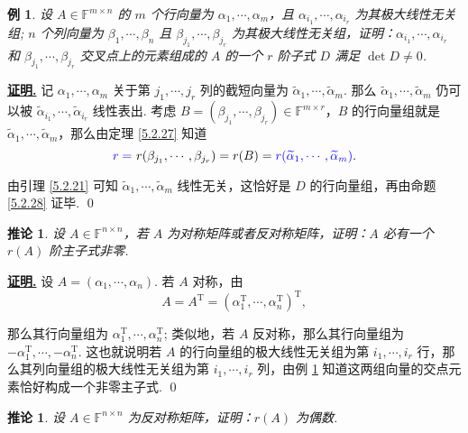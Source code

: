 \documentclass[10pt,openany]{article}
\theoremstyle{thmstyle} %
\theoremstyle{defstyle} %
\newtheorem{corollary}[theorem]{推论}
\theoremstyle{prostyle} %
\theoremstyle{exastyle}
\newtheorem{example}[theorem]{例}
\theoremstyle{remstyle}
\renewenvironment{proof}[1][证明]{\par\underline{\textbf{#1.}} \;\fangsong}{\qed\par}
\newcommand{\T}{^{\text{T}}}
\newcommand{\F}{\mathbb{F}}
\newcommand{\n}{^{n \times n}}
\newcommand{\mn}{^{m \times n}}
\begin{document}
\begin{example} \label{5.2.38}
	设 \( A \in \F\mn \) 的 \( m \) 个行向量为 \( \alpha_1,\cdots,\alpha_m \)，且 \( \alpha_{i_1},\cdots,\alpha_{i_r} \) 为其极大线性无关组; \( n \) 个列向量为 \( \beta_1,\cdots,\beta_n \) 且 \( \beta_{j_1},\cdots,\beta_{j_r} \) 为其极大线性无关组，证明：\( \alpha_{i_1},\cdots,\alpha_{i_r} \) 和 \( \beta_{j_1},\cdots,\beta_{j_r} \) 交叉点上的元素组成的 \( A \) 的一个 \( r \) 阶子式 \( D \) 满足 \( \det D \neq 0 \).
\end{example}

\begin{proof}
	记 \( \alpha_1,\cdots,\alpha_m \) 关于第 \( j_1,\cdots,j_r \) 列的截短向量为 \( \widetilde{\alpha}_1, \cdots, \widetilde{\alpha}_m \). 那么 {\color{blue} \( \widetilde{\alpha}_1, \cdots, \widetilde{\alpha}_m \) 仍可以被 \( \widetilde{\alpha}_{i_1}, \cdots, \widetilde{\alpha}_{i_r} \) 线性表出}. 考虑 \( B=(\beta_{j_1},\cdots,\beta_{j_r}) \in \F^{m \times r} \)，\( B \) 的行向量组就是 \( \widetilde{\alpha}_1, \cdots, \widetilde{\alpha}_m  \)，那么由定理 \ref{5.2.27} 知道
	\[ {\color{blue}r=} \ r(\beta_{j_1},\cdots,\beta_{j_r})=r(B)={\color{blue}r(\widetilde{\alpha}_1, \cdots, \widetilde{\alpha}_m)}. \]
	
	由引理 \ref{5.2.21} 可知 \( \widetilde{\alpha}_1, \cdots, \widetilde{\alpha}_m \) 线性无关，这恰好是 \( D \) 的行向量组，再由命题 \ref{5.2.28} 证毕.
\end{proof}




\begin{corollary} \label{5.3.29}
	设 \( A \in \F\n \)，若 \( A \) 为对称矩阵或者反对称矩阵，证明：\( A \) 必有一个 \( r(A) \) 阶主子式非零.
\end{corollary}

\begin{proof}
	设 \( A=(\alpha_1,\cdots,\alpha_n) \). 若 \( A \) 对称，由
	\[ A=A\T=(\alpha_1\T,\cdots,\alpha_n\T)\T, \]
	
	那么其行向量组为 \( \alpha_1\T,\cdots,\alpha_n\T \); 类似地，若 \( A \) 反对称，那么其行向量组为 \( -\alpha_1\T,\cdots,-\alpha_n\T \). 这也就说明若 \( A \) 的行向量组的极大线性无关组为第 \( i_1,\cdots,i_r \) 行，那么其列向量组的极大线性无关组为第 \( i_1,\cdots,i_r \) 列，由例 \ref{5.2.38} 知道这两组向量的交点元素恰好构成一个非零主子式.
\end{proof}




\begin{corollary}
	设 \( A \in \F\n \) 为反对称矩阵，证明：\( r(A) \) 为偶数.
\end{corollary}
\end{document}
